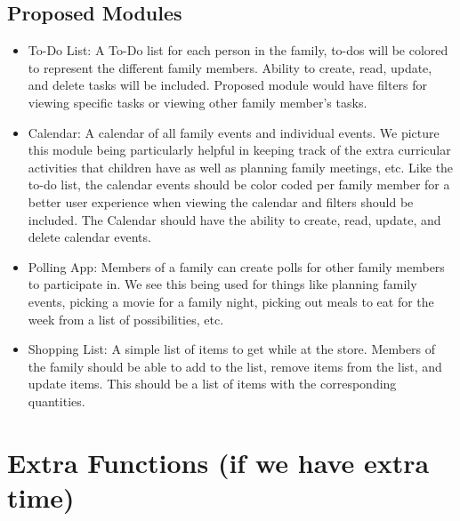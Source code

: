 \documentclass[12pt]{article}
\begin{document}
\subsection{Proposed Modules}
\begin{itemize}
    \item To-Do List: A To-Do list for each person in the family, to-dos will be colored to represent
            the different family members. Ability to create, read, update, and delete tasks will be included.
            Proposed module would have filters for viewing specific tasks or viewing other family member's tasks.
    \item Calendar: A calendar of all family events and individual events. We picture this module being particularly
            helpful in keeping track of the extra curricular activities that children have as well as planning
            family meetings, etc. Like the to-do list, the calendar events should be color coded per family member
            for a better user experience when viewing the calendar and filters should be included. The Calendar should have 
            the ability to create, read, update, and delete calendar events.
    \item Polling App: Members of a family can create polls for other family members to participate in. We see this being
            used for things like planning family events, picking a movie for a family night, picking out meals to eat for
            the week from a list of possibilities, etc. 
    \item Shopping List: A simple list of items to get while at the store. Members of the family should be able to add
            to the list, remove items from the list, and update items. This should be a list of items with the corresponding
            quantities.
\end{itemize}

\begingroup
\section{Extra Functions (if we have extra time)}
\end{document}
